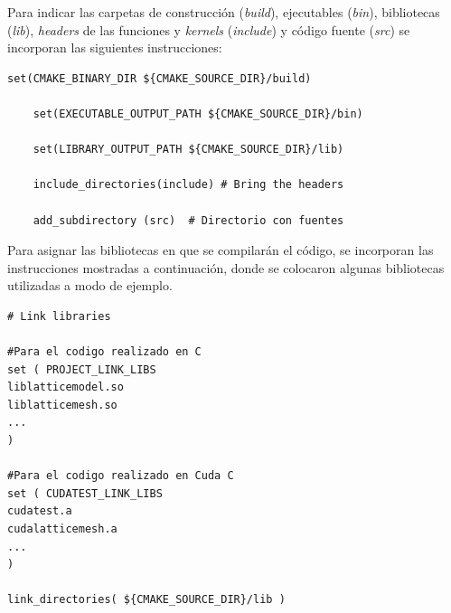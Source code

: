 Para indicar las carpetas de construcción (\textit{build}), ejecutables (\textit{bin}), bibliotecas (\textit{lib}), \textit{headers} de las funciones y \textit{kernels} (\textit{include}) y código fuente (\textit{src}) se incorporan las siguientes instrucciones:



{\footnotesize
	\begin{frame}{}
		\begin{lstlisting}[frame=single]
	set(CMAKE_BINARY_DIR ${CMAKE_SOURCE_DIR}/build)

	set(EXECUTABLE_OUTPUT_PATH ${CMAKE_SOURCE_DIR}/bin)

	set(LIBRARY_OUTPUT_PATH ${CMAKE_SOURCE_DIR}/lib)

	include_directories(include) # Bring the headers
	
	add_subdirectory (src) 	# Directorio con fuentes

		\end{lstlisting}
		
	\end{frame}
}


Para asignar las bibliotecas en que se compilarán el código, se incorporan las instrucciones mostradas a continuación, donde se colocaron algunas bibliotecas utilizadas a modo de ejemplo.
\newpage
{\footnotesize
	\begin{frame}{}
		\begin{lstlisting}[frame=single]
# Link libraries

#Para el codigo realizado en C
set ( PROJECT_LINK_LIBS 
liblatticemodel.so 		
liblatticemesh.so
...
)

#Para el codigo realizado en Cuda C
set ( CUDATEST_LINK_LIBS 
cudatest.a
cudalatticemesh.a
...
)

link_directories( ${CMAKE_SOURCE_DIR}/lib )
		
		\end{lstlisting}
		
	\end{frame}
}

